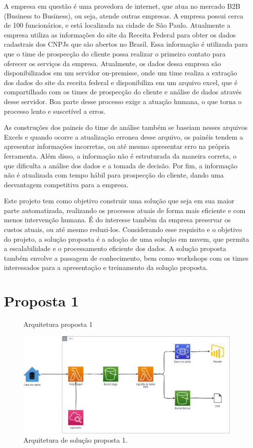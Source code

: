 A empresa em questão é uma provedora de internet, que atua no mercado B2B (Business to Business), ou seja, atende outras empresas. A empresa possui cerca de 100 funcionários, e está localizada na cidade de São Paulo. Atualmente a empresa utiliza as informações do site da Receita Federal para obter os dados cadastrais dos CNPJs que são abertos no Brasil. Essa informação é utilizada para que o time de prospecção do cliente possa realizar o primeiro contato para oferecer os serviços da empresa. Atualmente, os dados dessa empresa são disponibilizados em um servidor on-premisse, onde um time realiza a extração dos dados do site da receita federal e disponibiliza em um arquivo excel, que é compartilhado com os times de prospecção do cliente e análise de dados através desse servidor. Boa parte desse processo exige a atuação humana, o que torna o processo lento e suscetível a erros. 

As construções dos paineis do time de análise também se baseiam nesses arquivos Excels e quando ocorre a atualização erronea desse arquivo, os painéis tendem a apresentar informações incorretas, ou até mesmo apresentar erro na própria ferramenta. Além disso, a informação não é estruturada da maneira correta, o que dificulta a análise dos dados e a tomada de decisão. Por fim, a informação não é atualizada com tempo hábil para prospecção do cliente, dando uma desvantagem competitiva para a empresa.

Este projeto tem como objetivo construir uma solução que seja em sua maior parte automatizada, realizando os processos atuais de forma 
mais eficiente e com menos intervenção humana. É do interesse também da empresa preservar os custos atuais, ou até mesmo reduzi-los. Considerando esse requisito e o objetivo do projeto, a solução proposta é a adoção de uma solução em nuvem, que permita a escalabilidade e o processamento eficiente dos dados. A solução proposta também envolve a passagem de conhecimento, bem como workshops com os times interessados para a apresentação e treinamento da solução proposta.

\section{Proposta 1}

\begin{figure}[H]
    \centering
    \caption{Arquitetura proposta 1}
    \includegraphics[scale = 0.7]{imagens/arquitetura_aws.png}
    
    \caption*{Arquitetura de solução proposta 1.}
    \end{figure}

